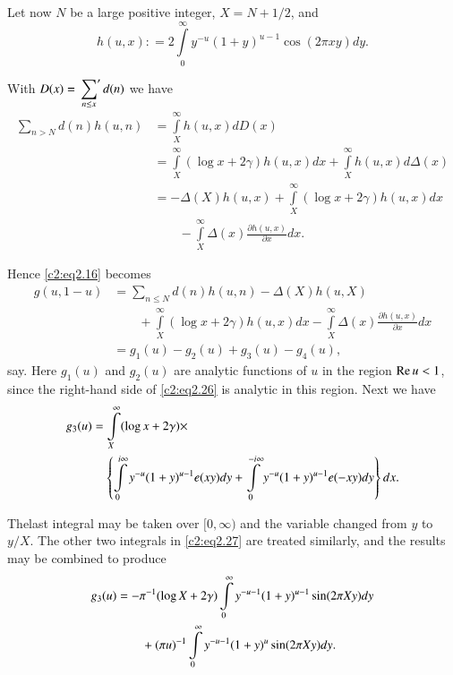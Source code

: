 Let now $N$ be a large positive integer, $X= N+ 1/2$, and 
\begin{equation}
  h(u, x) : = 2 \int\limits_0^\infty y^{-u} (1 + y)^{u-1} \cos (2 \pi x
  y) dy.\label{c2:eq2.26}
\end{equation}

With $\displaystyle{D(x)= \sideset{}{'}\sum_{n \leq x} d(n)}$ we have
\begin{align*}
  \sum_{n > N} d(n) h (u, n) &= \int\limits_X^\infty h(u, x) dD (x)\\
  &= \int\limits_X^\infty (\log x + 2 \gamma) h(u, x) dx +
  \int\limits_X^\infty h(u, x) d\Delta (x)\\
  &= - \Delta  (X) h (u, x) + \int\limits_X^\infty (\log x + 2
  \gamma) h (u, x) dx\\ 
  &\qquad - \int\limits_X^\infty \Delta  (x)
  \frac{\partial h(u, x)}{\partial x} dx.
\end{align*}

Hence \eqref{c2:eq2.16} becomes 
\begin{align*}
  g(u, 1-u)& =
  \sum_{n \leq N} d(n) h(u, n)- \Delta  (X) h (u, X)\\
  & \qquad +\int\limits_X^\infty (\log x + 2 \gamma)h (u, x) dx -
  \int\limits_X^\infty \Delta  (x) \frac{\partial h (u, x)}{\partial
    x} dx\\
  & = g_1 (u) - g_2 (u) + g_3 (u) - g_4 (u),
\end{align*}
say. Here $g_1 (u)$ and $g_2 (u)$ are analytic functions of $u$ in the
region $\operatorname{Re} u < 1$, since the right-hand side of \eqref{c2:eq2.26} is
analytic in this region. Next we have
\begin{align}
  g_3 (u) & = \int\limits_X^\infty (\log x + 2 \gamma)\times\notag\\ 
  & \quad \left\{
  \int\limits_{0}^{i \infty} y^{-u} (1+ y)^{u-1} e(xy) dy +
  \int\limits_0^{- i \infty} y^{-u} (1+y)^{u-1} e(- xy) dy \right\}
  dx.\label{c2:eq2.27} 
\end{align}

The\pageoriginale last integral may be taken over $[0, \infty)$ and
  the variable changed from $y$ to $y/X$. The other two integrals in
  \eqref{c2:eq2.27} are treated similarly, and the results may be
  combined to produce
\begin{align}
  g_3 (u) & = - \pi^{-1} (\log X + 2 \gamma) \int\limits_0^\infty
  y^{-u-1} (1+ y)^{u-1} \sin (2 \pi X y) dy\notag\\
  & \qquad + (\pi u)^{-1} \int\limits_0^\infty y^{-u -1} (1+ y)^u \sin
  (2 \pi Xy) dy.\label{c2:eq2.28}
\end{align}

